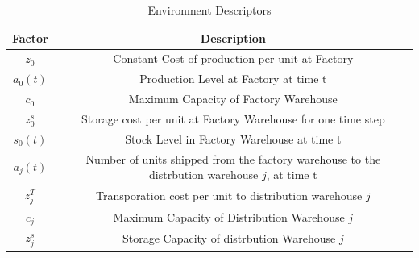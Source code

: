 \documentclass{article}
\begin{document}
\begin{table}[h!]
    \caption{Environment Descriptors}
    \centering
    \begin{tabular}{ c | c }
        \hline
        Factor   & Description                                                                                                                                                                         \\
        \hline
        $z_0$    & Constant Cost of production per unit at Factory                                                                                                                                     \\
        $a_0(t)$ & Production Level at Factory at time t                                                                                                                                               \\
        $c_0$    & Maximum Capacity of Factory Warehouse                                                                                                                                               \\
        $z_0^s$  & Storage cost per unit at Factory Warehouse for one time step                                                                                                                        \\
        $s_0(t)$ & Stock Level in Factory Warehouse at time t                                                                                                                                          \\
        $a_j(t)$ & Number of units shipped from the factory warehouse to the distrbution warehouse $j$, at time t                                                                                      \\
        $z_j^T$  & Transporation cost per unit to distribution warehouse $j$                                                                                                                           \\
        $c_j$    & Maximum Capacity of Distribution Warehouse $j$                                                                                                                                      \\
        $z_j^s$  & Storage Capacity of distrbution Warehouse $j$                                                                                                                                       \\

\end{tabular}
\end{table}
\end{document}
